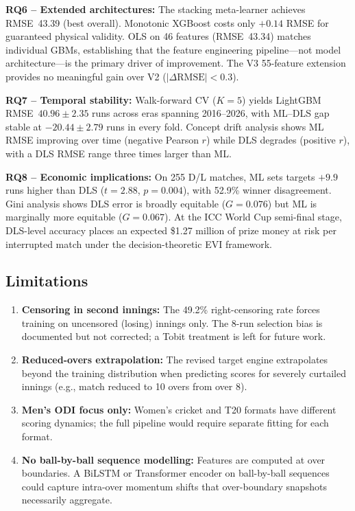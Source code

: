 \documentclass[10pt,a4paper,twocolumn]{article}
\begin{document}
\textbf{RQ6 -- Extended architectures:} The stacking meta-learner achieves RMSE~43.39 (best overall). Monotonic XGBoost costs only $+0.14$ RMSE for guaranteed physical validity. OLS on 46 features (RMSE~43.34) matches individual GBMs, establishing that the feature engineering pipeline---not model architecture---is the primary driver of improvement. The V3 55-feature extension provides no meaningful gain over V2 ($|\Delta\text{RMSE}| < 0.3$).

\textbf{RQ7 -- Temporal stability:} Walk-forward CV ($K=5$) yields LightGBM RMSE~$40.96 \pm 2.35$ runs across eras spanning 2016--2026, with ML--DLS gap stable at $-20.44 \pm 2.79$ runs in every fold. Concept drift analysis shows ML RMSE improving over time (negative Pearson $r$) while DLS degrades (positive $r$), with a DLS RMSE range three times larger than ML.

\textbf{RQ8 -- Economic implications:} On 255 D/L matches, ML sets targets $+9.9$ runs higher than DLS ($t=2.88$, $p=0.004$), with 52.9\% winner disagreement. Gini analysis shows DLS error is broadly equitable ($G=0.076$) but ML is marginally more equitable ($G=0.067$). At the ICC World Cup semi-final stage, DLS-level accuracy places an expected \$1.27 million of prize money at risk per interrupted match under the decision-theoretic EVI framework.

\subsection{Limitations}

\begin{enumerate}[leftmargin=1.2em]
\item \textbf{Censoring in second innings:} The 49.2\% right-censoring rate forces training on uncensored (losing) innings only. The 8-run selection bias is documented but not corrected; a Tobit treatment is left for future work.
\item \textbf{Reduced-overs extrapolation:} The revised target engine extrapolates beyond the training distribution when predicting scores for severely curtailed innings (e.g., match reduced to 10 overs from over 8).
\item \textbf{Men's ODI focus only:} Women's cricket and T20 formats have different scoring dynamics; the full pipeline would require separate fitting for each format.
\item \textbf{No ball-by-ball sequence modelling:} Features are computed at over boundaries. A BiLSTM or Transformer encoder on ball-by-ball sequences could capture intra-over momentum shifts that over-boundary snapshots necessarily aggregate.
\end{enumerate}
\end{document}
